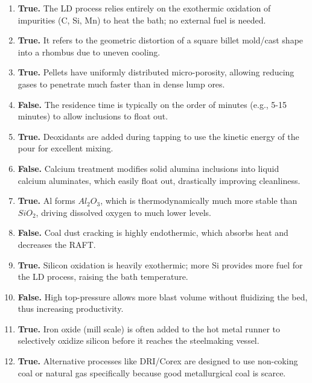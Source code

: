 \documentclass[11pt,a4paper]{article}
\begin{document}
\begin{solutionbox}
\begin{enumerate}
    \item[(a)] \textbf{True.} The LD process relies entirely on the exothermic oxidation of impurities (C, Si, Mn) to heat the bath; no external fuel is needed.
    \item[(b)] \textbf{True.} It refers to the geometric distortion of a square billet mold/cast shape into a rhombus due to uneven cooling.
    \item[(c)] \textbf{True.} Pellets have uniformly distributed micro-porosity, allowing reducing gases to penetrate much faster than in dense lump ores.
    \item[(d)] \textbf{False.} The residence time is typically on the order of minutes (e.g., 5-15 minutes) to allow inclusions to float out.
    \item[(e)] \textbf{True.} Deoxidants are added during tapping to use the kinetic energy of the pour for excellent mixing.
    \item[(f)] \textbf{False.} Calcium treatment modifies solid alumina inclusions into liquid calcium aluminates, which easily float out, drastically improving cleanliness.
    \item[(g)] \textbf{True.} Al forms $Al_2O_3$, which is thermodynamically much more stable than $SiO_2$, driving dissolved oxygen to much lower levels.
    \item[(h)] \textbf{False.} Coal dust cracking is highly endothermic, which absorbs heat and decreases the RAFT.
    \item[(i)] \textbf{True.} Silicon oxidation is heavily exothermic; more Si provides more fuel for the LD process, raising the bath temperature.
    \item[(j)] \textbf{False.} High top-pressure allows more blast volume without fluidizing the bed, thus increasing productivity.
    \item[(k)] \textbf{True.} Iron oxide (mill scale) is often added to the hot metal runner to selectively oxidize silicon before it reaches the steelmaking vessel.
    \item[(l)] \textbf{True.} Alternative processes like DRI/Corex are designed to use non-coking coal or natural gas specifically because good metallurgical coal is scarce.
\end{enumerate}
\end{solutionbox}

\end{document}
